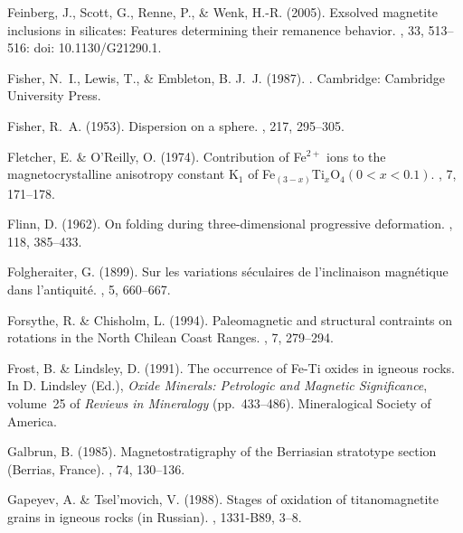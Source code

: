 \documentclass[11pt]{book}
\begin{document}
\begin{thebibliography}{}
Feinberg, J., Scott, G., Renne, P., \& Wenk, H.-R. (2005).
\newblock Exsolved magnetite inclusions in silicates: Features determining
  their remanence behavior.
, 33, 513--516: doi: 10.1130/G21290.1.

Fisher, N.~I., Lewis, T., \& Embleton, B. J.~J. (1987).
.
\newblock Cambridge: Cambridge University Press.

Fisher, R.~A. (1953).
\newblock Dispersion on a sphere.
, 217, 295--305.

Fletcher, E. \& O'Reilly, O. (1974).
\newblock Contribution of Fe$^{2+}$ ions to the magnetocrystalline anisotropy
  constant K$_1$ of Fe$_{(3-x)}$Ti$_x$O$_4 (0<x<0.1)$.
, 7, 171--178.

Flinn, D. (1962).
\newblock On folding during three-dimensional progressive deformation.
, 118, 385--433.

Folgheraiter, G. (1899).
\newblock Sur les variations s\'eculaires de l'inclinaison magn\'etique dans
  l'antiquit\'e.
, 5, 660--667.

Forsythe, R. \& Chisholm, L. (1994).
\newblock Paleomagnetic and structural contraints on rotations in the North
  Chilean Coast Ranges.
, 7, 279--294.

Frost, B. \& Lindsley, D. (1991).
\newblock The occurrence of Fe-Ti oxides in igneous rocks.
\newblock In D. Lindsley (Ed.), {\em Oxide Minerals: Petrologic and Magnetic
  Significance}, volume~25 of {\em Reviews in Mineralogy}  (pp.\ 433--486).
  Mineralogical Society of America.

Galbrun, B. (1985).
\newblock Magnetostratigraphy of the Berriasian stratotype section (Berrias,
  France).
, 74, 130--136.

Gapeyev, A. \& Tsel'movich, V. (1988).
\newblock Stages of oxidation of titanomagnetite grains in igneous rocks (in
  Russian).
, 1331-B89, 3--8.


\end{thebibliography}
\end{document}
